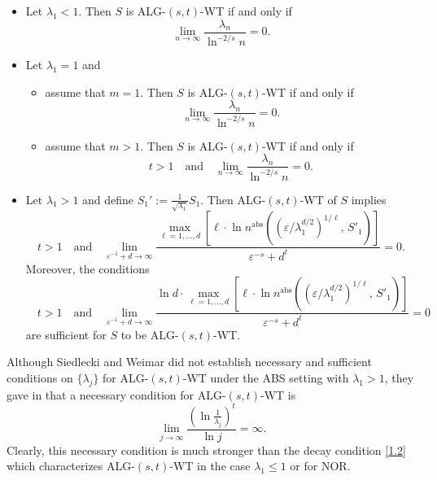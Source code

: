 \documentclass[10pt,a4paper]{amsart}
\numberwithin{equation}{section}
\def\vz{\varepsilon}
\def\lz{\lambda}
\begin{document}
    \begin{itemize}
        \item Let $\lambda_1<1$. Then $S$ is ALG-$(s,t)$-WT if and only if
            \begin{equation}\label{1.2}
                \lim_{n\to\infty}\frac{\lambda_n}{\ln^{-2/s}n}=0.
            \end{equation}
        \item Let $\lambda_1=1$ and
            \begin{itemize}
                \item[(1)] assume that $m=1$. Then $S$ is ALG-$(s,t)$-WT if and only if
                    \begin{equation*}
                        \lim_{n\to\infty}\frac{\lambda_n}{\ln^{-2/s}n}=0.
                    \end{equation*}
                \item[(2)] assume that $m>1$. Then $S$ is ALG-$(s,t)$-WT if and only if
                    \begin{equation*}
                        t>1
                        \quad \text{and} \quad
                        \lim_{n\to\infty}\frac{\lambda_n}{\ln^{-2/s}n}=0.
                    \end{equation*}
            \end{itemize}
        \item Let $\lambda_1>1$ and define $S_1':=\frac{1}{\sqrt{\lambda_1}} S_1$. Then ALG-$(s,t)$-WT of $S$ implies
    \begin{equation*}
        t>1
        \quad \text{and} \quad
        \lim_{\vz^{-1}+d\to\infty} \frac{\max_{\ell=1,\ldots,d}\limits \left[ \ell \cdot \ln n^{\mathrm{abs}}\!\left( ( \vz / \lambda_1^{d/2} )^{1/\ell},\, S'_1 \right) \right]}{\vz^{-s}+d^{t}}
        = 0.
    \end{equation*}
        Moreover, the conditions
    \begin{equation*}
        \quad t>1
        \quad \text{and} \quad
        \lim_{\vz^{-1}+d\to\infty} \frac{\ln d \cdot \max_{\ell=1,\dots,d}\limits \left[ \ell \cdot \ln n^{\mathrm{abs}}\!\left( ( \vz /\lambda_1^{d/2} )^{1/\ell},\, S'_1 \right) \right]}{\vz^{-s}+d^{t}}
        = 0
    \end{equation*}
    are sufficient for $S$ to be ALG-$(s,t)$-WT.
    \end{itemize}


Although Siedlecki and
Weimar did not establish necessary and sufficient conditions on
 $\{\lz_j\}$ for ALG-$(s,t)$-WT under the ABS setting with $\lz_1>1$, they
 gave in \cite[Lemma 3.12]{SW15} that  a necessary condition for ALG-$(s,t)$-WT is
\begin{equation*}
\lim_{j\rightarrow\infty}\frac{(\ln\frac{1}{\lambda_j})^t}{\ln
j}=\infty.
\end{equation*}
Clearly, this necessary condition is much stronger than the decay
condition \eqref{1.2} which characterizes ALG-$(s,t)$-WT in the
case $\lz_1\le1$ or for NOR.
\end{document}
